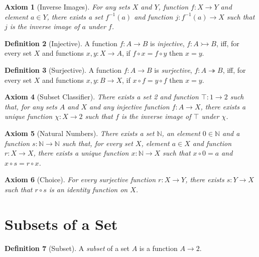 \documentclass{book}
\newtheorem{ax}{Axiom}[chapter]
\theoremstyle{definition}
\newtheorem{df}[ax]{Definition}
\begin{document}
\begin{ax}[Inverse Images]
For any sets $X$ and $Y$, function $f : X \rightarrow Y$ and element $a \in Y$, there exists a set $f^{-1}(a)$ and function $j : f^{-1}(a) \rightarrow X$ such that $j$ is the inverse image of $a$ under $f$.
\end{ax}

\begin{df}[Injective]
A function $f : A \rightarrow B$ is \emph{injective}, $f : A \rightarrowtail B$, iff, for every set $X$ and functions $x,y : X \rightarrow A$, if $f \circ x = f \circ y$ then $x = y$.
\end{df}

\begin{df}[Surjective]
A function $f : A \rightarrow B$ is \emph{surjective}, $f : A \twoheadrightarrow B$, iff, for every set $X$ and functions $x,y : B \rightarrow X$, if $x \circ f = y \circ f$ then $x = y$.
\end{df}

\begin{ax}[Subset Classifier]
There exists a set 2 and function $\top : 1 \rightarrow 2$ such that, for any sets $A$ and $X$ and any injective function $f : A \rightarrow X$, there exists a unique function $\chi : X \rightarrow 2$ such that $f$ is the inverse image of $\top$ under $\chi$.
\end{ax}

\begin{ax}[Natural Numbers]
There exists a set $\mathbb{N}$, an element $0 \in \mathbb{N}$ and a function $s : \mathbb{N} \rightarrow \mathbb{N}$ such that, for every set $X$, element $a \in X$ and function $r : X \rightarrow X$, there exists a unique function $x : \mathbb{N} \rightarrow X$ such that $x \circ 0 = a$ and $x \circ s = r \circ x$.
\end{ax}

\begin{ax}[Choice]
For every surjective function $r : X \rightarrow Y$, there exists $s : Y \rightarrow X$ such that $r \circ s$ is an identity function on $X$.
\end{ax}

\section{Subsets of a Set}

\begin{df}[Subset]
A \emph{subset} of a set $A$ is a function $A \rightarrow 2$.
\end{df}
\end{document}
